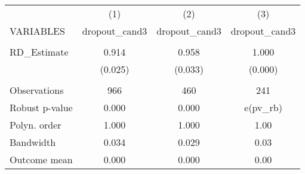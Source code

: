 \documentclass[]{article}
\begin{document}
\begin{tabular}{lccc} \hline
 & (1) & (2) & (3) \\
VARIABLES & dropout\_cand3 & dropout\_cand3 & dropout\_cand3 \\ \hline
 &  &  &  \\
RD\_Estimate & 0.914 & 0.958 & 1.000 \\
 & (0.025) & (0.033) & (0.000) \\
 &  &  &  \\
Observations & 966 & 460 & 241 \\
Robust p-value & 0.000 & 0.000 & e(pv\_rb) \\
Polyn. order & 1.000 & 1.000 & 1.00 \\
Bandwidth & 0.034 & 0.029 & 0.03 \\
 Outcome mean & 0.000 & 0.000 & 0.00 \\ \hline
\end{tabular}
\end{document}
